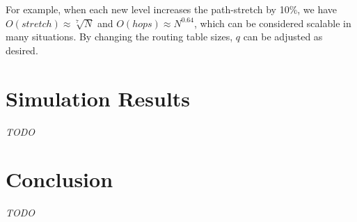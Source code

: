 \documentclass[14pt]{extarticle}
\theoremstyle{definition}
\begin{document}
For example, when each new level increases the path-stretch by 10\%, we have \mbox{$ O(stretch) \approx \sqrt[7]{N} $} and $O(hops) \approx N^{0.64}$, which can be considered scalable in many situations. By changing the routing table sizes, $q$ can be adjusted as desired.


\section{Simulation Results}
\emph{TODO}
\section{Conclusion}
\emph{TODO}




\end{document}
